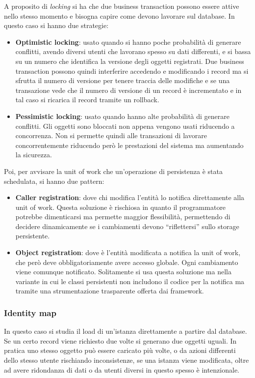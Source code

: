 A proposito di \textit{locking} si ha che due business transaction possono essere
attive nello stesso momento e bisogna capire come devono lavorare sul database.
In questo caso si hanno due strategie:
\begin{itemize}
    \item \textbf{Optimistic locking}: usato quando si hanno poche probabilità
          di generare conflitti, avendo diversi utenti che lavorano spesso su dati
          differenti, e si bassa su un numero che identifica la versione degli oggetti
          registrati. Due business transaction possono quindi interferire accedendo e
          modificando i record ma si sfrutta il numero di versione per tenere traccia
          delle modifiche e se una transazione vede che il numero di versione di un record è
          incrementato e in tal caso si ricarica il record tramite un rollback.
    \item \textbf{Pessimistic locking}: usato quando hanno alte probabilità di
          generare conflitti. Gli oggetti sono bloccati non appena vengono usati riducendo
          a concorrenza. Non si permette quindi alle transazioni di lavorare
          concorrentemente riducendo però le prestazioni del sistema ma aumentando la sicurezza.
\end{itemize}
Poi, per avvisare la unit of work che un'operazione di persistenza è stata
schedulata, si hanno due pattern:
\begin{itemize}
    \item \textbf{Caller registration}: dove chi modifica l'entità lo notifica
          direttamente alla unit of work. Questa soluzione è rischiosa in quanto il
          programmatore potrebbe dimenticarsi ma permette maggior flessibilità, permettendo
          di decidere dinamicamente se i cambiamenti devono “riflettersi” sullo storage
          persistente.
    \item \textbf{Object registration}: dove è l'entità modificata a notifica la
          unit of work, che però deve obbligatoriamente avere accesso globale. Ogni
          cambiamento viene comunque notificato. Solitamente si usa questa soluzione ma
          nella variante in cui le classi persistenti non includono il codice per la
          notifica ma tramite una strumentazione trasparente offerta dai framework.
\end{itemize}
\subsubsection{Identity map}
In questo caso si studia il load di un'istanza direttamente a partire dal database.
Se un certo record viene richiesto due volte si generano due oggetti uguali.
In pratica uno stesso oggetto può essere caricato più volte, o da azioni differenti
dello stesso utente rischiando inconsistenze, se una istanza viene modificata, oltre
ad avere ridondanza di dati o da utenti diversi in questo spesso è intenzionale.

